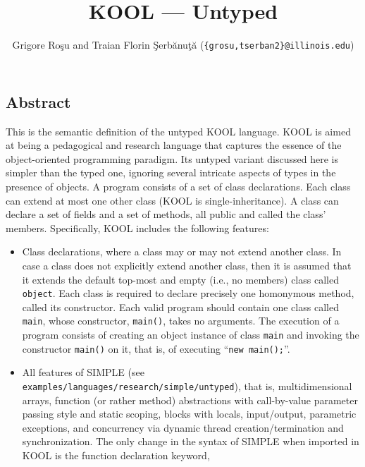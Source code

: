 \setlength{\parindent}{1em}
\title{KOOL --- Untyped}
\author{Grigore Ro\c{s}u and 
        Traian Florin \c{S}erb\u{a}nu\c{t}\u{a}
        (\texttt{\{grosu,tserban2\}@illinois.edu})}

\maketitle

\begin{latexComment}
\section{Abstract}
This is the \K semantic definition of the untyped KOOL language.
KOOL is aimed at being a pedagogical and research language that
captures the essence of the object-oriented programming paradigm.
Its untyped variant discussed here is simpler than the typed one,
ignoring several intricate aspects of types in the
presence of objects.  A program consists of a set of class declarations.
Each class can extend at most one other class (KOOL is single-inheritance).
A class can declare a set of fields and a set of methods, all public and
called the class' members.
Specifically, KOOL includes the following features:
\begin{itemize}
\item Class declarations, where a class may or may not extend another class.
In case a class does not explicitly extend another class, then it is assumed
that it extends the default top-most and empty (i.e., no members)
class called \texttt{object}.  Each class is required to declare precisely one
homonymous method, called its constructor.  Each valid program should contain
one class called \texttt{main}, whose constructor, \texttt{main()}, takes no
arguments.  The execution of a program consists of creating an object instance
of class \texttt{main} and invoking the constructor \texttt{main()} on it,
that is, of executing ``\texttt{new main();}''.
\item All features of SIMPLE (see
{\footnotesize\texttt{examples/languages/research/simple/untyped}}),
that is, multidimensional arrays, function (or rather method) abstractions
with call-by-value parameter passing style and static scoping, blocks with
locals, input/output, parametric exceptions, and concurrency via dynamic
thread creation/termination and synchronization.  The only change in the
syntax of SIMPLE when imported in KOOL is the function declaration keyword,

\end{itemize}
\end{latexComment}
